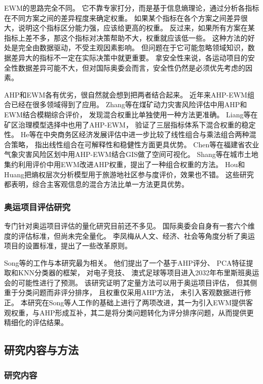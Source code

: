 \documentclass[twoside]{CUGThesis}
\begin{document}
EWM的思路完全不同。
它不靠专家打分，而是基于信息熵理论\cite{Shannon1948}，通过分析各指标在不同方案之间的差异程度来确定权重\cite{Wang2019,Hwang1981}。
如果某个指标在各个方案之间差异很大，说明这个指标区分能力强，应该给更高的权重。
反过来，如果所有方案在某指标上差不多，那这个指标对决策帮助不大，权重就应该低一些。
这种方法的好处是完全由数据驱动，不受主观因素影响。
但问题在于它可能忽略领域知识，数据差异大的指标不一定在实际决策中就更重要。
拿安全性来说，各运动项目的安全性数据差异可能不大，但对国际奥委会而言，安全性仍然是必须优先考虑的因素。

AHP和EWM各有优劣，很自然就会想到把两者结合起来。
近年来AHP-EWM组合已经在很多领域得到了应用。
Zhang等\cite{Zhang2023}在煤矿动力灾害风险评估中用AHP和EWM结合模糊综合评价，
发现混合权重比单独使用一种方法更准确。
Liang等\cite{Liang2023}在矿区治理模型选择中也用了AHP-EWM，
验证了三层指标体系下混合权重的稳定性。
He等\cite{He2025}在中央商务区经济发展评估中进一步比较了线性组合与乘法组合两种混合策略，
指出线性组合在可解释性和稳健性方面更具优势。
Chen等\cite{Chen2016}在福建省农业气象灾害风险区划中用AHP-EWM结合GIS做了空间可视化。
Shang等\cite{Shang2009}在城市土地集约利用评价中用EWM改进AHP权重，提出了一种组合权重的方法。
Hou和Huang\cite{Hou2010}把熵权层次分析模型用于旅游地社区参与度评价，效果也不错。
这些研究都表明，综合主客观信息的混合方法比单一方法更具优势。

\subsubsection{奥运项目评估研究}

专门针对奥运项目评估的量化研究目前还不多见。
国际奥委会自身有一套六个维度的评估标准，但尚未完全量化。
李凤梅\cite{Li2013}从人文、经济、社会等角度分析了奥运项目的设置标准，提出了一些改革原则。

Song等\cite{Song2025}的工作与本研究最为相关。
他们提出了一个基于AHP评分、
PCA特征提取和KNN分类器的框架，
对电子竞技、
澳式足球等项目进入2032年布里斯班奥运会的可能性进行了预测。
该研究证明了定量方法可以用于奥运项目评估，
但其侧重于分类问题而非评分排序，
且权重仅采用AHP方法，
未引入客观数据进行修正。
本研究在Song等人工作的基础上进行了两项改进，其一为引入EWM提供客观权重，与AHP形成互补，其二是将分类问题转化为评分排序问题，从而提供更精细化的评估结果。

\subsection{研究内容与方法}

\subsubsection{研究内容}
\end{document}
